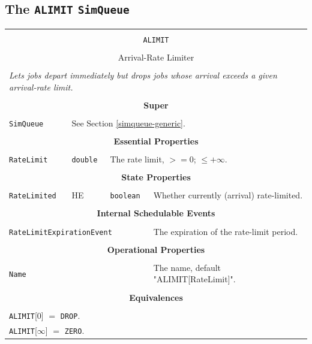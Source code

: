 \documentclass[12pt]{book}
\begin{document}
\subsection{The \lstinline{ALIMIT} \lstinline{SimQueue}}

\begin{tabular}{|l|l|l|l|}
\hline
\multicolumn{4}{|c|}{} \\
\multicolumn{4}{|c|}{\lstinline[basicstyle=\large]{ALIMIT}} \\
\multicolumn{4}{|c|}{} \\
\multicolumn{4}{|c|}{Arrival-Rate Limiter} \\
\multicolumn{4}{|c|}{} \\
\hline
\multicolumn{4}{|l|}{\em Lets jobs depart immediately but drops jobs whose arrival exceeds a given arrival-rate limit.} \\
\hline
\multicolumn{4}{|c|}{} \\
\multicolumn{4}{|c|}{\bf Super} \\
\multicolumn{4}{|c|}{} \\
\hline
\lstinline|SimQueue| & \multicolumn{3}{|l|}{See Section \ref{simqueue-generic}.} \\
\hline
\multicolumn{4}{|c|}{} \\
\multicolumn{4}{|c|}{\bf Essential Properties} \\
\multicolumn{4}{|c|}{} \\
\hline
\lstinline|RateLimit| & \lstinline|double| & \multicolumn{2}{|l|}{The rate limit, $>= 0$; $\leq +\infty$.} \\
\hline
\multicolumn{4}{|c|}{} \\
\multicolumn{4}{|c|}{\bf State Properties} \\
\multicolumn{4}{|c|}{} \\
\hline
\lstinline|RateLimited| & HE & \lstinline|boolean| & Whether currently (arrival) rate-limited. \\
\hline
\multicolumn{4}{|c|}{} \\
\multicolumn{4}{|c|}{\bf Internal Schedulable Events} \\
\multicolumn{4}{|c|}{} \\
\hline
\multicolumn{3}{|l|}{\lstinline|RateLimitExpirationEvent|} & The expiration of the rate-limit period. \\
\hline
\multicolumn{4}{|c|}{} \\
\multicolumn{4}{|c|}{\bf Operational Properties} \\
\multicolumn{4}{|c|}{} \\
\hline
\multicolumn{3}{|l|}{\lstinline|Name|} & The name, default "ALIMIT[RateLimit]". \\
\hline
\multicolumn{4}{|c|}{} \\
\multicolumn{4}{|c|}{\bf Equivalences} \\
\multicolumn{4}{|c|}{} \\
\hline
\multicolumn{4}{|l|}{\lstinline|ALIMIT|[$0$] $=$ \lstinline|DROP|.} \\
\multicolumn{4}{|l|}{\lstinline|ALIMIT|[$\infty$] $=$ \lstinline|ZERO|.} \\
\hline
\end{tabular}
\end{document}
